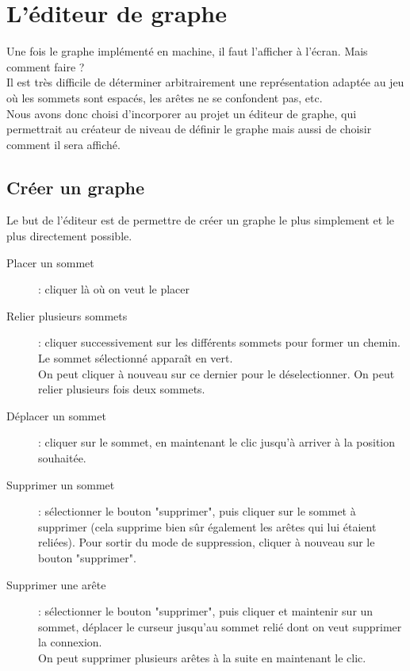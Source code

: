 \documentclass[12pt]{article}
\begin{document}
\section{L'éditeur de graphe}
Une fois le graphe implémenté en machine, il faut l'afficher à l'écran. Mais comment faire ?\\
Il est très difficile de déterminer arbitrairement une représentation adaptée au jeu où les sommets sont espacés, les arêtes ne se confondent pas, etc.\\
Nous avons donc choisi d'incorporer au projet un éditeur de graphe, qui permettrait au créateur de niveau de définir le graphe mais aussi de choisir comment il sera affiché.

\subsection{Créer un graphe}
Le but de l'éditeur est de permettre de créer un graphe le plus simplement et le plus directement possible.

\begin{description}
    \item[Placer un sommet]:
    cliquer là où on veut le placer

    \item[Relier plusieurs sommets]:
    cliquer successivement sur les différents sommets pour former un chemin. Le sommet sélectionné apparaît en vert.\\
    On peut cliquer à nouveau sur ce dernier pour le déselectionner. On peut relier plusieurs fois deux sommets.

    \item[Déplacer un sommet]:
    cliquer sur le sommet, en maintenant le clic jusqu'à arriver à la position souhaitée.

    \item[Supprimer un sommet]:
    sélectionner le bouton "supprimer", puis cliquer sur le sommet à supprimer (cela supprime bien sûr également les arêtes qui lui étaient reliées). Pour sortir du mode de suppression, cliquer à nouveau sur le bouton "supprimer".

    \item[Supprimer une arête]:
    sélectionner le bouton "supprimer", puis cliquer et maintenir sur un sommet, déplacer le curseur jusqu'au sommet relié dont on veut supprimer la connexion.\\
    On peut supprimer plusieurs arêtes à la suite en maintenant le clic.

\end{description}
\end{document}
